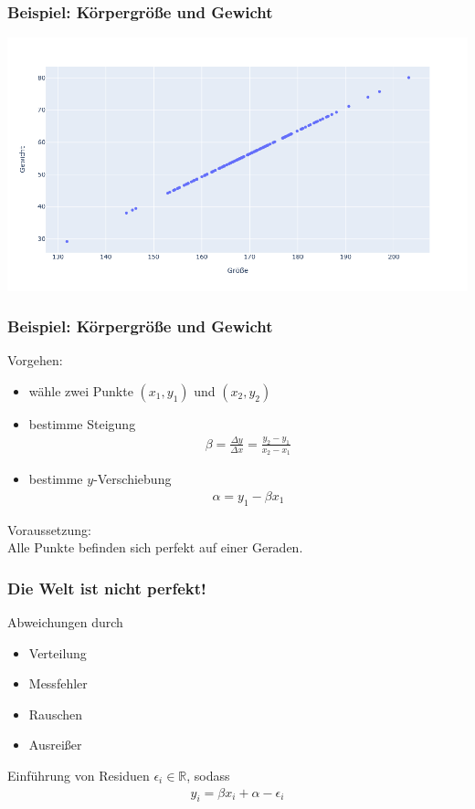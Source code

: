 
\begin{frame}
\frametitle{Beispiel: Körpergröße und Gewicht}

\begin{center}
	\includegraphics[width=\linewidth]{fig8/artifical.png}
\end{center}

\end{frame}


\begin{frame}
\frametitle{Beispiel: Körpergröße und Gewicht}

Vorgehen:
\begin{itemize}
	\item wähle zwei Punkte $(x_1, y_1)$ und $(x_2, y_2)$
	\item bestimme Steigung \begin{align*} \beta = \tfrac{\Delta y}{\Delta x} = \tfrac{y_2 - y_1}{x_2 - x_1} \end{align*}
	\item bestimme $y$-Verschiebung \begin{align*} \alpha = y_1 - \beta x_1 \end{align*}
\end{itemize}

Voraussetzung: \\ Alle Punkte befinden sich perfekt auf einer Geraden.

\end{frame}


\begin{frame}
\frametitle{Die Welt ist nicht perfekt!}

Abweichungen durch
\begin{itemize}
	\item Verteilung
	\item Messfehler
	\item Rauschen
	\item Ausreißer
\end{itemize}

Einführung von Residuen $\epsilon_i \in \mathbb{R}$, sodass
\begin{align*}
	y_i = \beta x_i + \alpha - \epsilon_i
\end{align*}

\end{frame}

